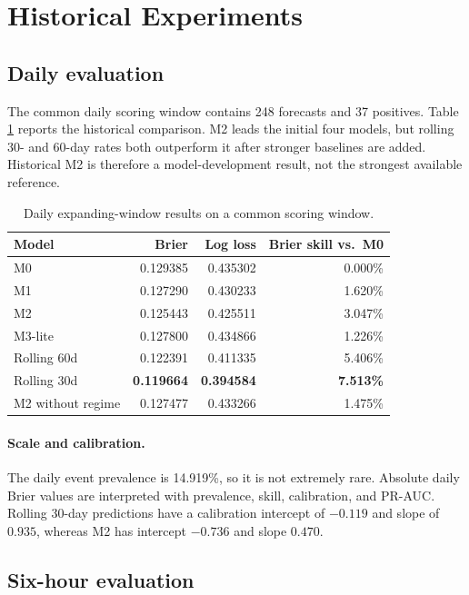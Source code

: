 \section{Historical Experiments}

\subsection{Daily evaluation}

The common daily scoring window contains 248 forecasts and 37 positives. Table
\ref{tab:daily} reports the historical comparison. M2 leads the initial four models, but rolling
30- and 60-day rates both outperform it after stronger baselines are added. Historical M2 is
therefore a model-development result, not the strongest available reference.

\begin{table}[h]
\centering
\caption{Daily expanding-window results on a common scoring window.}
\label{tab:daily}
\begin{tabular}{lrrr}
\toprule
Model & Brier & Log loss & Brier skill vs.\ M0 \\
\midrule
M0 & 0.129385 & 0.435302 & 0.000\% \\
M1 & 0.127290 & 0.430233 & 1.620\% \\
M2 & 0.125443 & 0.425511 & 3.047\% \\
M3-lite & 0.127800 & 0.434866 & 1.226\% \\
\midrule
Rolling 60d & 0.122391 & 0.411335 & 5.406\% \\
Rolling 30d & \textbf{0.119664} & \textbf{0.394584} & \textbf{7.513\%} \\
M2 without regime & 0.127477 & 0.433266 & 1.475\% \\
\bottomrule
\end{tabular}
\end{table}

\paragraph{Scale and calibration.}
The daily event prevalence is 14.919\%, so it is not extremely rare. Absolute daily Brier values
are interpreted with prevalence, skill, calibration, and PR-AUC. Rolling 30-day predictions have a
calibration intercept of $-0.119$ and slope of $0.935$, whereas M2 has intercept $-0.736$ and slope
$0.470$.

\subsection{Six-hour evaluation}

